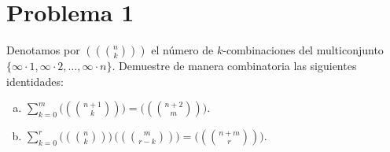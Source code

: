 
\section*{Problema 1}
Denotamos por $((n\choose k))$ el número de $k$-combinaciones del multiconjunto $\{\infty\cdot1,\infty\cdot2,\dots,\infty\cdot n\}$. Demuestre de manera combinatoria las siguientes identidades:
\begin{enumerate}[a)]
  \item $\displaystyle \sum_{k=0}^{m} \bigl((n+1\choose k)\bigr) = \bigl((n+2\choose m)\bigr).$
  \item $\displaystyle \sum_{k=0}^{r} \bigl((n\choose k)\bigr)\,\bigl((m\choose r-k)\bigr) = \bigl((n+m\choose r)\bigr).$
\end{enumerate}

